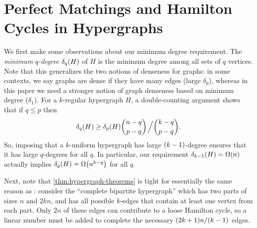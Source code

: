 \documentclass[11pt,english]{article}
\theoremstyle{plain}
\theoremstyle{definition}
\theoremstyle{definition}
\theoremstyle{plain}
\theoremstyle{plain}
\theoremstyle{plain}
\theoremstyle{plain}
\theoremstyle{remark}
\theoremstyle{remark}
\let\originalleft\left
\let\originalright\right
\renewcommand{\left}{\mathopen{}\mathclose\bgroup\originalleft}
\renewcommand{\right}{\aftergroup\egroup\originalright}
\begin{document}
\section{\label{sec:hypergraphs}Perfect Matchings and Hamilton Cycles in
Hypergraphs}

We first make some observations about our minimum degree requirement.
The \emph{minimum $q$-degree} $\delta_{q}\left(H\right)$ of $H$
is the minimum degree among all sets of $q$ vertices. Note that this
generalizes the two notions of denseness for graphs: in some contexts,
we say graphs are dense if they have many edges (large $\delta_{0}$),
whereas in this paper we need a stronger notion of graph denseness
based on minimum degree ($\delta_{1}$). For a $k$-regular hypergraph
$H$, a double-counting argument shows that if $q\le p$ then
\[
\delta_{q}\left(H\right)\ge\delta_{p}\left(H\right){n-q \choose p-q}\left.\vphantom{\sum}\right/{k-q \choose p-q}.
\]
So, imposing that a $k$-uniform hypergraph has large $\left(k-1\right)$-degree
ensures that it has large $q$-degrees for all $q$. In particular,
our requirement $\delta_{k-1}\left(H\right)=\Omega\left(n\right)$
actually implies $\delta_{q}\left(H\right)=\Omega\left(n^{k-q}\right)$
for all $q$.

Next, note that \ref{thm:hypergraph-theorems} is tight for essentially
the same reason as \cite[Theorem~1]{BFM03}: consider the ``complete
bipartite hypergraph'' which has two parts of sizes $n$ and
$2kn$, and has all possible $k$-edges that contain at least one
vertex from each part. Only $2n$ of these edges can contribute
to a loose Hamilton cycle, so a linear number must be added to complete
the necessary $\left(2k+1\right)n/\left(k-1\right)$ edges.
\end{document}
